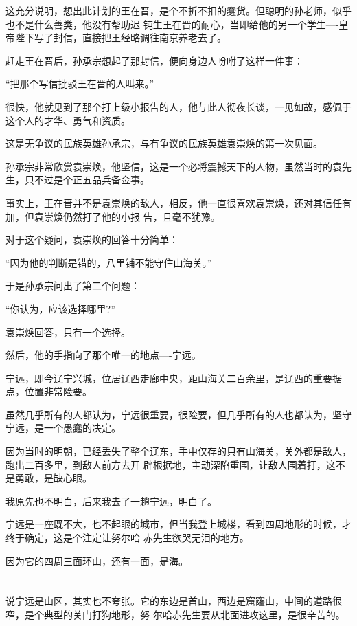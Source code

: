 \documentclass[11pt,a4paper,onecolumn]{article}
\begin{document}
这充分说明，想出此计划的王在晋，是个不折不扣的蠢货。但聪明的孙老师，似乎也不是什么善类，他没有帮助迟
钝生王在晋的耐心，当即给他的另一个学生----皇帝陛下写了封信，直接把王经略调往南京养老去了。

赶走王在晋后，孙承宗想起了那封信，便向身边人吩咐了这样一件事：

``把那个写信批驳王在晋的人叫来。''

很快，他就见到了那个打上级小报告的人，他与此人彻夜长谈，一见如故，感佩于这个人的才华、勇气和资质。

这是无争议的民族英雄孙承宗，与有争议的民族英雄袁崇焕的第一次见面。

孙承宗非常欣赏袁崇焕，他坚信，这是一个必将震撼天下的人物，虽然当时的袁先生，只不过是个正五品兵备佥事。

事实上，王在晋并不是袁崇焕的敌人，相反，他一直很喜欢袁崇焕，还对其信任有加，但袁崇焕仍然打了他的小报
告，且毫不犹豫。

对于这个疑问，袁崇焕的回答十分简单：

``因为他的判断是错的，八里铺不能守住山海关。''

于是孙承宗问出了第二个问题：

``你认为，应该选择哪里?''

袁崇焕回答，只有一个选择。

然后，他的手指向了那个唯一的地点----宁远。

宁远，即今辽宁兴城，位居辽西走廊中央，距山海关二百余里，是辽西的重要据点，位置非常险要。

虽然几乎所有的人都认为，宁远很重要，很险要，但几乎所有的人也都认为，坚守宁远，是一个愚蠢的决定。

因为当时的明朝，已经丢失了整个辽东，手中仅存的只有山海关，关外都是敌人，跑出二百多里，到敌人前方去开
辟根据地，主动深陷重围，让敌人围着打，这不是勇敢，是缺心眼。

我原先也不明白，后来我去了一趟宁远，明白了。

宁远是一座既不大，也不起眼的城市，但当我登上城楼，看到四周地形的时候，才终于确定，这是个注定让努尔哈
赤先生欲哭无泪的地方。

因为它的四周三面环山，还有一面，是海。

\section[\thesection]{}

说宁远是山区，其实也不夸张。它的东边是首山，西边是窟窿山，中间的道路很窄，是个典型的关门打狗地形，努
尔哈赤先生要从北面进攻这里，是很辛苦的。
\end{document}
